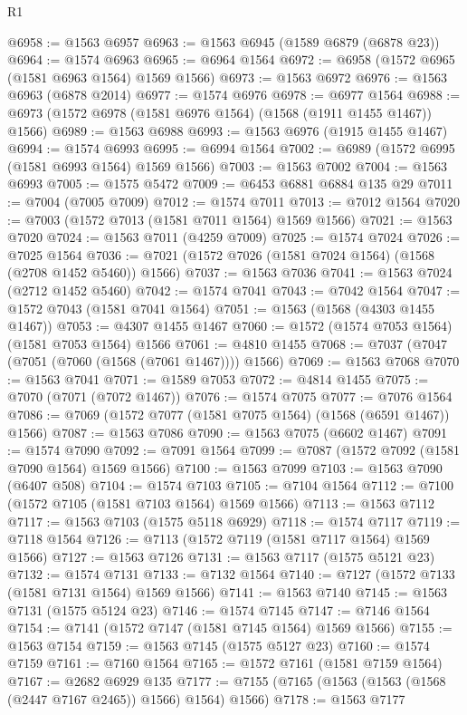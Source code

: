 \begin{lexlean}{R1}
\begin{coremodule}
@6958 := @1563 @6957
@6963 := @1563 @6945 (@1589 @6879 (@6878 @23))
@6964 := @1574 @6963
@6965 := @6964 @1564
@6972 := @6958 (@1572 @6965 (@1581 @6963 @1564) @1569 @1566)
@6973 := @1563 @6972
@6976 := @1563 @6963 (@6878 @2014)
@6977 := @1574 @6976
@6978 := @6977 @1564
@6988 := @6973 (@1572 @6978 (@1581 @6976 @1564) (@1568 (@1911 @1455 @1467)) @1566)
@6989 := @1563 @6988
@6993 := @1563 @6976 (@1915 @1455 @1467)
@6994 := @1574 @6993
@6995 := @6994 @1564
@7002 := @6989 (@1572 @6995 (@1581 @6993 @1564) @1569 @1566)
@7003 := @1563 @7002
@7004 := @1563 @6993
@7005 := @1575 @5472
@7009 := @6453 @6881 @6884 @135 @29
@7011 := @7004 (@7005 @7009)
@7012 := @1574 @7011
@7013 := @7012 @1564
@7020 := @7003 (@1572 @7013 (@1581 @7011 @1564) @1569 @1566)
@7021 := @1563 @7020
@7024 := @1563 @7011 (@4259 @7009)
@7025 := @1574 @7024
@7026 := @7025 @1564
@7036 := @7021 (@1572 @7026 (@1581 @7024 @1564) (@1568 (@2708 @1452 @5460)) @1566)
@7037 := @1563 @7036
@7041 := @1563 @7024 (@2712 @1452 @5460)
@7042 := @1574 @7041
@7043 := @7042 @1564
@7047 := @1572 @7043 (@1581 @7041 @1564)
@7051 := @1563 (@1568 (@4303 @1455 @1467))
@7053 := @4307 @1455 @1467
@7060 := @1572 (@1574 @7053 @1564) (@1581 @7053 @1564) @1566
@7061 := @4810 @1455
@7068 := @7037 (@7047 (@7051 (@7060 (@1568 (@7061 @1467)))) @1566)
@7069 := @1563 @7068
@7070 := @1563 @7041
@7071 := @1589 @7053
@7072 := @4814 @1455
@7075 := @7070 (@7071 (@7072 @1467))
@7076 := @1574 @7075
@7077 := @7076 @1564
@7086 := @7069 (@1572 @7077 (@1581 @7075 @1564) (@1568 (@6591 @1467)) @1566)
@7087 := @1563 @7086
@7090 := @1563 @7075 (@6602 @1467)
@7091 := @1574 @7090
@7092 := @7091 @1564
@7099 := @7087 (@1572 @7092 (@1581 @7090 @1564) @1569 @1566)
@7100 := @1563 @7099
@7103 := @1563 @7090 (@6407 @508)
@7104 := @1574 @7103
@7105 := @7104 @1564
@7112 := @7100 (@1572 @7105 (@1581 @7103 @1564) @1569 @1566)
@7113 := @1563 @7112
@7117 := @1563 @7103 (@1575 @5118 @6929)
@7118 := @1574 @7117
@7119 := @7118 @1564
@7126 := @7113 (@1572 @7119 (@1581 @7117 @1564) @1569 @1566)
@7127 := @1563 @7126
@7131 := @1563 @7117 (@1575 @5121 @23)
@7132 := @1574 @7131
@7133 := @7132 @1564
@7140 := @7127 (@1572 @7133 (@1581 @7131 @1564) @1569 @1566)
@7141 := @1563 @7140
@7145 := @1563 @7131 (@1575 @5124 @23)
@7146 := @1574 @7145
@7147 := @7146 @1564
@7154 := @7141 (@1572 @7147 (@1581 @7145 @1564) @1569 @1566)
@7155 := @1563 @7154
@7159 := @1563 @7145 (@1575 @5127 @23)
@7160 := @1574 @7159
@7161 := @7160 @1564
@7165 := @1572 @7161 (@1581 @7159 @1564)
@7167 := @2682 @6929 @135
@7177 := @7155 (@7165 (@1563 (@1563 (@1568 (@2447 @7167 @2465)) @1566) @1564) @1566)
@7178 := @1563 @7177

\end{coremodule}
\end{lexlean}
